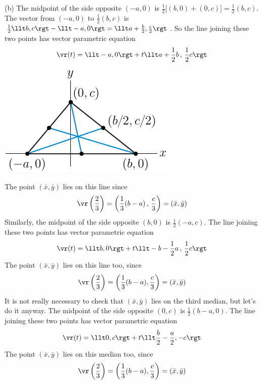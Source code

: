 \begin{solution}
(b) The midpoint of the side opposite $(-a,0)$ is $\frac{1}{2}\big[(b,0)+(0,c)\big]=\frac{1}{2}(b,c)$.
The vector from $(-a,0)$ to $\frac{1}{2}(b,c)$ is $ \frac{1}{2}\llt b,c\rgt-\llt-a,0\rgt
=\llt a+\frac{b}{2},\frac{c}{2}\rgt$. So
the line joining these two points has vector parametric equation
\begin{equation*}
\vr(t)=\llt -a,0\rgt+t\llt a+\frac{1}{2} b\,,\,\frac{1}{2} c\rgt
\end{equation*}
\begin{center}
     \includegraphics{fig/OE03AQ6.pdf}
\end{center}
The point $(\bar x,\bar y)$ lies on this line since
\begin{equation*}
\vr\left(\frac{2}{3}\right)=\left(\frac{1}{3}(b-a)\,,\,\frac{c}{3}\right)
=(\bar x,\bar y)
\end{equation*}
Similarly, the midpoint of the side opposite $(b,0)$ is $\frac{1}{2}(-a,c)$.
The line joining these two points has vector parametric equation
\begin{equation*}
\vr(t)=\llt b,0\rgt +t\llt-b-\frac{1}{2} a\,,\,\frac{1}{2} c\rgt
\end{equation*}
The point $(\bar x,\bar y)$ lies on this line too, since
\begin{equation*}
\vr\left(\frac{2}{3}\right)=\left(\frac{1}{3}(b-a),\frac{c}{3}\right)
=(\bar x,\bar y)
\end{equation*}
It is not really necessary to check that $(\bar x,\bar y)$ lies on the
third median, but let's do it anyway. The midpoint of the side opposite $(0,c)$ is $\frac{1}{2}(b-a,0)$.
The line joining these two points has vector parametric equation
\begin{equation*}
\vr(t)=\llt 0,c\rgt+t\llt\frac{b}{2}-\frac{a}{2},-c\rgt
\end{equation*}
The point $(\bar x,\bar y)$ lies on this median too, since
\begin{equation*}
\vr\left(\frac{2}{3}\right)=\left(\frac{1}{3}(b-a),\frac{c}{3}\right)
=(\bar x,\bar y)
\end{equation*}
\end{solution}
